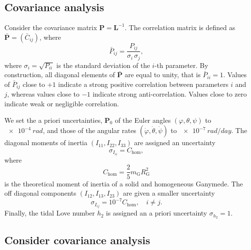\documentclass[pdflatex,sn-mathphys-num]{sn-jnl}%
\theoremstyle{thmstyleone}%
\theoremstyle{thmstyletwo}%
\theoremstyle{thmstylethree}%
\renewcommand{\vec}[1]{\boldsymbol{#1}}
\begin{document}
	
			
\subsection{Covariance analysis}\label{sec:covariance}

Consider the covariance matrix ${\vec{P} = \vec{L}^{-1}}$.
The correlation matrix is defined as ${\bar{\vec{P}} = (\bar{C}_{ij})}$, where
\begin{equation}
	\label{eq:correlation_matrix}
	 \bar{P}_{ij} = \frac{P_{ij}}{\sigma_i\,\sigma_j},
\end{equation}
where ${\sigma_i = \sqrt{P_{ii}}}$ is the standard deviation of the $i$-th parameter.  
By construction, all diagonal elements of $\bar{\vec{P}}$ are equal to unity, that is ${\bar{P}_{ii}=1}$.
Values of $\bar{P}_{ij}$ close to $+1$ indicate a strong positive correlation between parameters $i$ and $j$, whereas values close to $-1$ indicate strong anti-correlation. Values close to zero indicate weak or negligible correlation.


We set the a priori uncertainties, $\vec{P}_{0}$ of the Euler angles $(\varphi,\theta,\psi)$ to
$\SI{e-4}{rad}$, %
and those of the angular rates $(\dot{\varphi},\dot{\theta},\dot{\psi})$ to
$\SI{e-7}{rad/day}$. %
The diagonal moments of inertia $(I_{11}, I_{22}, I_{33})$ are assigned an uncertainty
\begin{equation}
	\sigma_{I_{ii}} = 
	C_{\mathrm{hom}},
\end{equation}
where 
\begin{equation}
C_{\mathrm{hom}} = \frac{2}{5} m_{\mathrm{G}}R_{\mathrm{G}}^2 
\end{equation}
is the theoretical moment of inertia of a solid and homogeneous Ganymede.
The off diagonal components $(I_{12}, I_{13}, I_{23})$ are given a smaller uncertainty
\begin{equation}
	\sigma_{I_{ij}} =
	10^{-7} %
	C_{\mathrm{hom}}, \quad i\neq j.
\end{equation}
Finally, the tidal Love number $h_2$ is assigned an a priori uncertainty 
${\sigma_{h_2} = 1}$. %


\subsection{Consider covariance analysis}\label{sec:consider_covariance}
\end{document}
